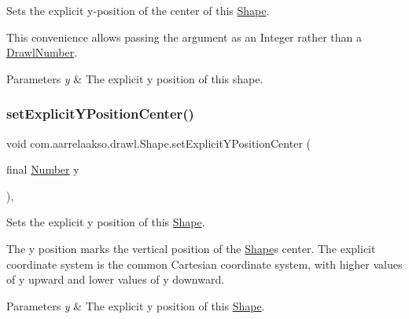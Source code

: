 Sets the explicit y-\/position of the center of this \hyperlink{classcom_1_1aarrelaakso_1_1drawl_1_1_shape}{Shape}. 

This convenience allows passing the argument as an Integer rather than a \hyperlink{classcom_1_1aarrelaakso_1_1drawl_1_1_drawl_number}{Drawl\+Number}.


\begin{DoxyParams}{Parameters}
{\em y} & The explicit y position of this shape. \\
\hline
\end{DoxyParams}
\mbox{\label{classcom_1_1aarrelaakso_1_1drawl_1_1_shape_a7d49d69bd74e57c3a3341a025c3cce50}} 
\subsubsection{\texorpdfstring{set\+Explicit\+Y\+Position\+Center()}{setExplicitYPositionCenter()}\hspace{0.1cm}{\footnotesize\ttfamily [2/2]}}
{\footnotesize\ttfamily void com.\+aarrelaakso.\+drawl.\+Shape.\+set\+Explicit\+Y\+Position\+Center (\begin{DoxyParamCaption}\item[{final \hyperlink{interfacecom_1_1aarrelaakso_1_1drawl_1_1_number}{Number}}]{y }\end{DoxyParamCaption})\hspace{0.3cm}{\ttfamily [protected]}, {\ttfamily [inherited]}}



Sets the explicit y position of this \hyperlink{classcom_1_1aarrelaakso_1_1drawl_1_1_shape}{Shape}. 

The y position marks the vertical position of the \hyperlink{classcom_1_1aarrelaakso_1_1drawl_1_1_shape}{Shape}\textquotesingle{}s center. The explicit coordinate system is the common Cartesian coordinate system, with higher values of y upward and lower values of y downward.


\begin{DoxyParams}{Parameters}
{\em y} & The explicit y position of this \hyperlink{classcom_1_1aarrelaakso_1_1drawl_1_1_shape}{Shape}. \\
\hline
\end{DoxyParams}
\mbox{\label{classcom_1_1aarrelaakso_1_1drawl_1_1_shape_a81ff4feb49b8f74c1a639564748a23ee}} 
